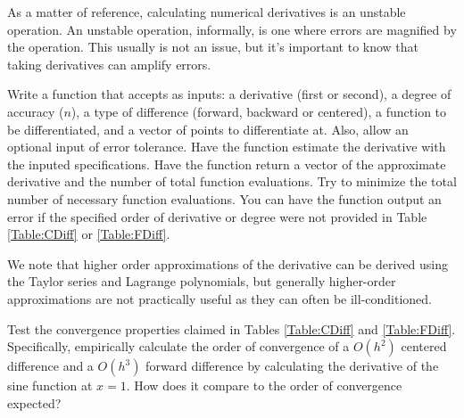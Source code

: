 As a matter of reference, calculating numerical derivatives is an unstable operation. An unstable operation, informally, is one where errors are magnified by the operation. This usually is not an issue, but it's important to know that taking derivatives can amplify errors.

\begin{problem}
Write a function that accepts as inputs: a derivative (first or second), a degree of accuracy ($n$), a type of difference (forward, backward or centered), a function to be differentiated, and a vector of points to differentiate at. Also, allow an optional input of error tolerance. Have the function estimate the derivative with the inputed specifications. Have the function return a vector of the approximate derivative and the number of total function evaluations. Try to minimize the total number of necessary function evaluations. You can have the function output an error if the specified order of derivative or degree were not provided in Table \ref{Table:CDiff} or \ref{Table:FDiff}.
\end{problem}

We note that higher order approximations of the derivative can be derived using the Taylor series and Lagrange polynomials, but generally higher-order approximations are not practically useful as they can often be ill-conditioned.

\begin{problem}
Test the convergence properties claimed in Tables \ref{Table:CDiff} and \ref{Table:FDiff}. Specifically, empirically calculate the order of convergence of a $O(h^2)$ centered difference and a $O(h^3)$ forward difference by calculating the derivative of the sine function at $x=1$. How does it compare to the order of convergence expected?
\end{problem}

